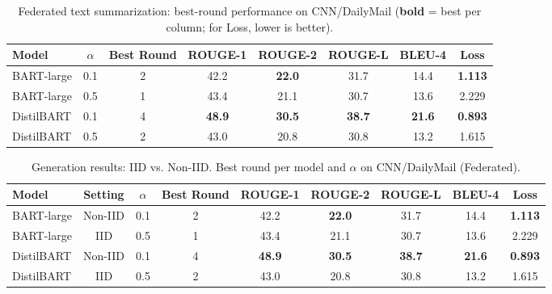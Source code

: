 \documentclass[conference]{IEEEtran}
\begin{document}
\begin{table}[t]
    \centering
    \caption{Federated text summarization: best-round performance on CNN/DailyMail (\textbf{bold} = best per column; for Loss, lower is better).}
    \label{tab:fed_text_summarization}
    {\small
    \begin{tabular}{lccccccc}
        \hline
        Model & $\alpha$ & Best Round & ROUGE-1 & ROUGE-2 & ROUGE-L & BLEU-4 & Loss \\
        \hline
        BART-large & 0.1 & 2 & 42.2 & \textbf{22.0} & 31.7 & 14.4 & \textbf{1.113} \\
        BART-large & 0.5 & 1 & 43.4 & 21.1 & 30.7 & 13.6 & 2.229 \\
        DistilBART & 0.1 & 4 & \textbf{48.9} & \textbf{30.5} & \textbf{38.7} & \textbf{21.6} & \textbf{0.893} \\
        DistilBART & 0.5 & 2 & 43.0 & 20.8 & 30.8 & 13.2 & 1.615 \\
        \hline
    \end{tabular}}
\end{table}


\begin{table}[t]
    \centering
    \caption{Generation results: IID vs. Non-IID. Best round per model and $\alpha$ on CNN/DailyMail (Federated).}
    \label{tab:gen_iid_vs_noniid}
    {\small
    \begin{tabular}{lcccccccc}
        \hline
        Model & Setting & $\alpha$ & Best Round & ROUGE-1 & ROUGE-2 & ROUGE-L & BLEU-4 & Loss \\
        \hline
        BART-large & Non-IID & 0.1 & 2 & 42.2 & \textbf{22.0} & 31.7 & 14.4 & \textbf{1.113} \\
        BART-large & IID     & 0.5 & 1 & 43.4 & 21.1 & 30.7 & 13.6 & 2.229 \\
        DistilBART & Non-IID & 0.1 & 4 & \textbf{48.9} & \textbf{30.5} & \textbf{38.7} & \textbf{21.6} & \textbf{0.893} \\
        DistilBART & IID     & 0.5 & 2 & 43.0 & 20.8 & 30.8 & 13.2 & 1.615 \\
        \hline
    \end{tabular}}
\end{table}
\end{document}
